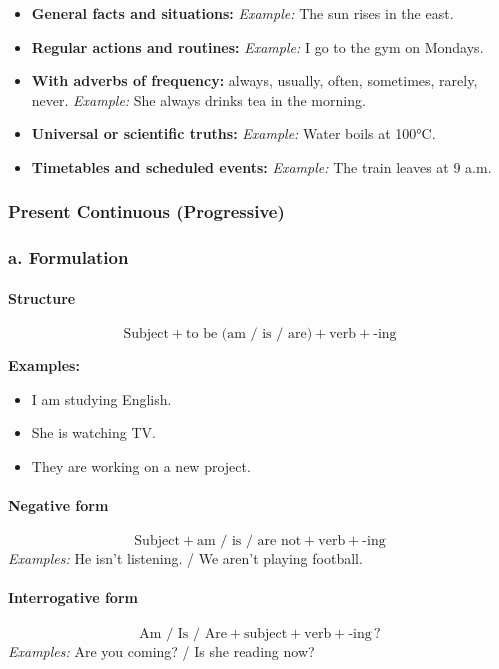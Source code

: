 \documentclass[11pt,a4paper]{article}
\begin{document}
\begin{itemize}
  \item \textbf{General facts and situations:}  
  \textit{Example:} The sun rises in the east.
  \item \textbf{Regular actions and routines:}  
  \textit{Example:} I go to the gym on Mondays.
  \item \textbf{With adverbs of frequency:} always, usually, often, sometimes, rarely, never.  
  \textit{Example:} She always drinks tea in the morning.
  \item \textbf{Universal or scientific truths:}  
  \textit{Example:} Water boils at 100°C.
  \item \textbf{Timetables and scheduled events:}  
  \textit{Example:} The train leaves at 9 a.m.
\end{itemize}


\subsubsection{Present Continuous (Progressive)}


\subsubsection*{a. Formulation}

\paragraph{Structure}
\[
\text{Subject} + \text{to be (am / is / are)} + \text{verb} + \text{-ing}
\]

\textbf{Examples:}
\begin{itemize}
  \item I am studying English.
  \item She is watching TV.
  \item They are working on a new project.
\end{itemize}

\paragraph{Negative form}
\[
\text{Subject} + \text{am / is / are not} + \text{verb} + \text{-ing}
\]
\textit{Examples:}  
He isn’t listening. / We aren’t playing football.

\paragraph{Interrogative form}
\[
\text{Am / Is / Are} + \text{subject} + \text{verb} + \text{-ing} \, ?
\]
\textit{Examples:}  
Are you coming? / Is she reading now?
\end{document}
